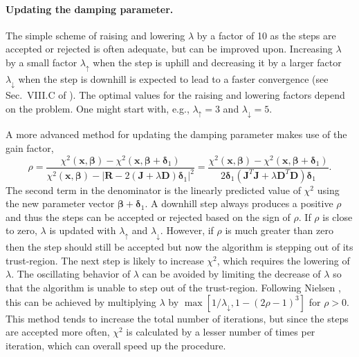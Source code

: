 \documentclass{article}
\begin{document}
\paragraph{Updating the damping parameter.} The simple scheme of raising and lowering $\lambda$ by a factor of 10 as the steps are accepted or rejected is often adequate, but can be improved upon. Increasing $\lambda$ by a small factor $\lambda_\uparrow$ when the step is uphill and decreasing it by a larger factor $\lambda_\downarrow$ when the step is downhill is expected to lead to a faster convergence (see Sec.~VIII.C of \cite{transtrum11}). The optimal values for the raising and lowering factors depend on the problem. One might start with, e.g., $\lambda_\uparrow=3$ and $\lambda_\downarrow=5$.

A more advanced method for updating the damping parameter makes use of the gain factor,
\begin{equation}
  \label{eq:gain_factor}
  \rho = \frac{\chi^2(\bm x, \bm\beta) - \chi^2(\bm x,
    \bm\beta+\bm\delta_1)}{\chi^2(\bm x, \bm\beta) - \left| \bm R - 2(\bm J+\lambda\bm
      D)\bm\delta_1 \right|^2} = \frac{\chi^2(\bm x, \bm\beta) -
    \chi^2(\bm x, \bm\beta+\bm\delta_1)}{2\bm\delta_1(\bm J^T\bm
    J+\lambda\bm D^T\bm D)\bm\delta_1}.
\end{equation}
The second term in the denominator is the linearly predicted value of $\chi^2$ using the new parameter vector $\bm\beta+\bm\delta_1$. A downhill step always produces a positive $\rho$ and thus the steps can be accepted or rejected based on the sign of $\rho$. If $\rho$ is close to zero, $\lambda$ is updated with $\lambda_\uparrow$ and $\lambda_\downarrow$. However, if $\rho$ is much greater than zero then the step should still be accepted but now the algorithm is stepping out of its trust-region. The next step is likely to increase $\chi^2$, which requires the lowering of $\lambda$. The oscillating behavior of $\lambda$ can be avoided by limiting the decrease of $\lambda$ so that the algorithm is unable to step out of the trust-region. Following Nielsen \cite{nielsen99}, this can be achieved by multiplying $\lambda$ by $\max[1/\lambda_\downarrow,1-(2\rho-1)^3]$ for $\rho>0$. This method tends to increase the total number of iterations, but since the steps are accepted more often, $\chi^2$ is calculated by a lesser number of times per iteration, which can overall speed up the procedure.
\end{document}
